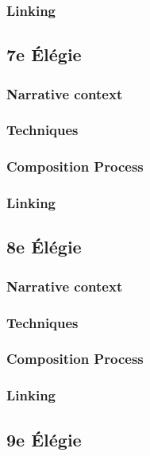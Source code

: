 \documentclass[12pt,twoside,maitrise]{dms}
\theoremstyle{definition}
\numberwithin{equation}{section}
\numberwithin{table}{chapter}
\numberwithin{figure}{chapter}
\begin{document}
\subsubsection{Linking}

\subsection{7e Élégie}

\subsubsection{Narrative context}

\subsubsection{Techniques}

\subsubsection{Composition Process}

\subsubsection{Linking}

\subsection{8e Élégie}

\subsubsection{Narrative context}

\subsubsection{Techniques}

\subsubsection{Composition Process}

\subsubsection{Linking}

\subsection{9e Élégie}
\end{document}
